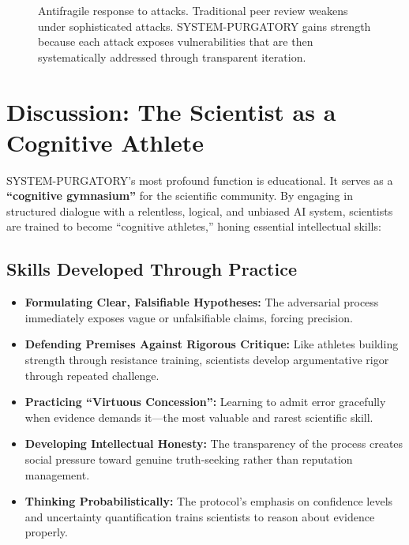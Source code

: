 \documentclass[11pt,a4paper]{article}
\begin{document}
\begin{small}
\begin{figure}[h!]
\begin{tikzpicture}[scale=1.3]
\end{tikzpicture}
\caption{Antifragile response to attacks. Traditional peer review weakens under sophisticated attacks. SYSTEM-PURGATORY gains strength because each attack exposes vulnerabilities that are then systematically addressed through transparent iteration.}
\label{fig:antifragile_science}
\end{figure}

\section{Discussion: The Scientist as a Cognitive Athlete}
SYSTEM-PURGATORY's most profound function is educational. It serves as a \textbf{``cognitive gymnasium''} for the scientific community. By engaging in structured dialogue with a relentless, logical, and unbiased AI system, scientists are trained to become ``cognitive athletes,'' honing essential intellectual skills:

\subsection{Skills Developed Through Practice}
\begin{itemize}[nosep]
    \item \textbf{Formulating Clear, Falsifiable Hypotheses:} The adversarial process immediately exposes vague or unfalsifiable claims, forcing precision.
    
    \item \textbf{Defending Premises Against Rigorous Critique:} Like athletes building strength through resistance training, scientists develop argumentative rigor through repeated challenge.
    
    \item \textbf{Practicing ``Virtuous Concession'':} Learning to admit error gracefully when evidence demands it—the most valuable and rarest scientific skill.
    
    \item \textbf{Developing Intellectual Honesty:} The transparency of the process creates social pressure toward genuine truth-seeking rather than reputation management.
    
    \item \textbf{Thinking Probabilistically:} The protocol's emphasis on confidence levels and uncertainty quantification trains scientists to reason about evidence properly.
\end{itemize}


\end{small}
\end{document}
